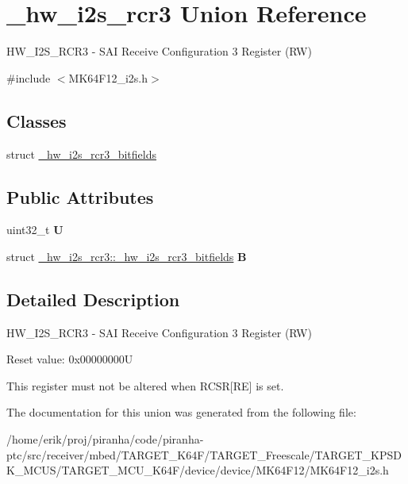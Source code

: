 \hypertarget{union__hw__i2s__rcr3}{}\section{\+\_\+hw\+\_\+i2s\+\_\+rcr3 Union Reference}
\label{union__hw__i2s__rcr3}


H\+W\+\_\+\+I2\+S\+\_\+\+R\+C\+R3 -\/ S\+AI Receive Configuration 3 Register (RW)  




{\ttfamily \#include $<$M\+K64\+F12\+\_\+i2s.\+h$>$}

\subsection*{Classes}
\begin{DoxyCompactItemize}
\item 
struct \hyperlink{struct__hw__i2s__rcr3_1_1__hw__i2s__rcr3__bitfields}{\+\_\+hw\+\_\+i2s\+\_\+rcr3\+\_\+bitfields}
\end{DoxyCompactItemize}
\subsection*{Public Attributes}
\begin{DoxyCompactItemize}
\item 
uint32\+\_\+t {\bfseries U}\hypertarget{union__hw__i2s__rcr3_a183f9ed774f57dbc11615b9e91b66a69}{}\label{union__hw__i2s__rcr3_a183f9ed774f57dbc11615b9e91b66a69}

\item 
struct \hyperlink{struct__hw__i2s__rcr3_1_1__hw__i2s__rcr3__bitfields}{\+\_\+hw\+\_\+i2s\+\_\+rcr3\+::\+\_\+hw\+\_\+i2s\+\_\+rcr3\+\_\+bitfields} {\bfseries B}\hypertarget{union__hw__i2s__rcr3_ac0de7998217bdf7d5e086c9e048f9d12}{}\label{union__hw__i2s__rcr3_ac0de7998217bdf7d5e086c9e048f9d12}

\end{DoxyCompactItemize}


\subsection{Detailed Description}
H\+W\+\_\+\+I2\+S\+\_\+\+R\+C\+R3 -\/ S\+AI Receive Configuration 3 Register (RW) 

Reset value\+: 0x00000000U

This register must not be altered when R\+C\+SR\mbox{[}RE\mbox{]} is set. 

The documentation for this union was generated from the following file\+:\begin{DoxyCompactItemize}
\item 
/home/erik/proj/piranha/code/piranha-\/ptc/src/receiver/mbed/\+T\+A\+R\+G\+E\+T\+\_\+\+K64\+F/\+T\+A\+R\+G\+E\+T\+\_\+\+Freescale/\+T\+A\+R\+G\+E\+T\+\_\+\+K\+P\+S\+D\+K\+\_\+\+M\+C\+U\+S/\+T\+A\+R\+G\+E\+T\+\_\+\+M\+C\+U\+\_\+\+K64\+F/device/device/\+M\+K64\+F12/M\+K64\+F12\+\_\+i2s.\+h\end{DoxyCompactItemize}
